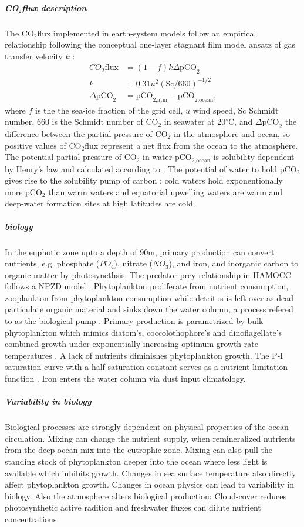 \documentclass[12pt]{article}
\begin{document}
\subparagraph{CO$_2$flux description}
The CO$_2$flux implemented in earth-system models follow an empirical relationship following the conceptual one-layer stagnant film model ansatz of gas transfer velocity $k$ \citep{Wanninkhof1992}: 
\begin{align*}
{CO}_2\text{flux} &= (1-f)k \Delta \text{pCO}_2 \\
				k &= 0.31 u^2(\text{Sc}/660)^{-1/2}\\
				\Delta \text{pCO}_2 &= \text{pCO}_{2\text{,atm}} - \text{pCO}_{2\text{,ocean}} \text{,}
\end{align*}
where $f$ is the the sea-ice fraction of the grid cell, $u$ wind speed, $\text{Sc}$ Schmidt number, 660 is the Schmidt number of CO$_2$ in seawater at 20$^\circ$C, and $\Delta \text{pCO}_2$ the difference between the partial pressure of CO$_2$ in the atmosphere and ocean, so positive values of CO$_2$flux represent a net flux from the ocean to the atmosphere. The potential partial pressure of CO$_2$ in water pCO$_{2\text{,ocean}}$ is solubility dependent by Henry's law and calculated according to \citep{Weiss1974}. The potential of water to hold pCO$_2$ gives rise to the solubility pump of carbon \citep{VolkHoffert1985}: cold waters hold exponentionally more pCO$_2$ than warm waters and equatorial upwelling waters are warm and deep-water formation sites at high latitudes are cold.

\subparagraph{biology}
In the euphotic zone upto a depth of 90m, primary production can convert nutrients, e.g. phosphate ($PO_4$), nitrate ($NO_3$), and iron, and inorganic carbon to organic matter by photosynethsis. The predator-prey relationship in HAMOCC follows a NPZD model \citep{Six1996}. Phytoplankton proliferate from nutrient consumption, zooplankton from phytoplankton consumption while detritus is left over as dead particulate organic material and sinks down the water column, a process refered to as the biological pump \citep{VolkHoffert1985}. Primary production is parametrized by bulk phytoplankton which mimics diatom's, coccolothophore's and dinoflagellate's combined growth under exponentially increasing optimum growth rate temperatures \citep{Eppley1972}. A lack of nutrients diminishes phytoplankton growth. The P-I saturation curve with a half-saturation constant serves as a nutrient limitation function \citep{Smith1936}. Iron enters the water column via dust input climatology. 

\subparagraph{Variability in biology}
Biological processes are strongly dependent on physical properties of the ocean circulation. Mixing can change the nutrient supply, when remineralized nutrients from the deep ocean mix into the eutrophic zone. Mixing can also pull the standing stock of phytoplankton deeper into the ocean where less light is available which inhibits growth. Changes in sea surface temperature also directly affect phytoplankton growth. Changes in ocean physics can lead to variability in biology. Also the atmosphere alters biological production: Cloud-cover reduces photosynthetic active radition and freshwater fluxes can dilute nutrient concentrations. 
\end{document}

